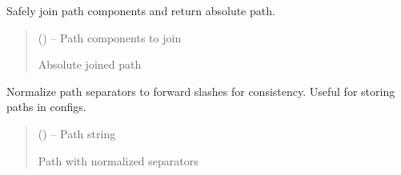 \documentclass[a4paper,11pt,english,openany,oneside]{sphinxmanual}
\begin{document}
\begin{fulllineitems}
\label{\detokenize{modules/core:core.path_utils.safe_path_join}}
\pysigstartsignatures
\pysiglinewithargsret
{}
{}
{}
\pysigstopsignatures
\sphinxAtStartPar
Safely join path components and return absolute path.
\begin{quote}\begin{description}
\sphinxAtStartPar
{} () – Path components to join

\sphinxAtStartPar
Absolute joined path

\sphinxAtStartPar
{}

\end{description}\end{quote}

\end{fulllineitems}


\begin{fulllineitems}
\label{\detokenize{modules/core:core.path_utils.normalize_path_separators}}
\pysigstartsignatures
\pysiglinewithargsret
{}
{}
{}
\pysigstopsignatures
\sphinxAtStartPar
Normalize path separators to forward slashes for consistency.
Useful for storing paths in configs.
\begin{quote}\begin{description}
\sphinxAtStartPar
{} () – Path string

\sphinxAtStartPar
Path with normalized separators

\sphinxAtStartPar
{}

\end{description}\end{quote}

\end{fulllineitems}
\end{document}
